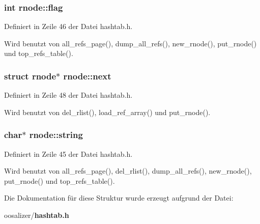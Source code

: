 \subsubsection{\setlength{\rightskip}{0pt plus 5cm}int {\bf rnode::flag}}\label{structrnode_d5613de994a7efcb74acdb20ac8c2913}




Definiert in Zeile 46 der Datei hashtab.h.

Wird benutzt von all\_\-refs\_\-page(), dump\_\-all\_\-refs(), new\_\-rnode(), put\_\-rnode() und top\_\-refs\_\-table().
\subsubsection{\setlength{\rightskip}{0pt plus 5cm}struct {\bf rnode}$\ast$ {\bf rnode::next}}\label{structrnode_92d155180af669f0207cd3682c132468}




Definiert in Zeile 48 der Datei hashtab.h.

Wird benutzt von del\_\-rlist(), load\_\-ref\_\-array() und put\_\-rnode().
\subsubsection{\setlength{\rightskip}{0pt plus 5cm}char$\ast$ {\bf rnode::string}}\label{structrnode_6709bc4db86e039dd874dede6175a4d1}




Definiert in Zeile 45 der Datei hashtab.h.

Wird benutzt von all\_\-refs\_\-page(), del\_\-rlist(), dump\_\-all\_\-refs(), new\_\-rnode(), put\_\-rnode() und top\_\-refs\_\-table().

Die Dokumentation f\"{u}r diese Struktur wurde erzeugt aufgrund der Datei:\begin{CompactItemize}
\item 
oosalizer/{\bf hashtab.h}\end{CompactItemize}
